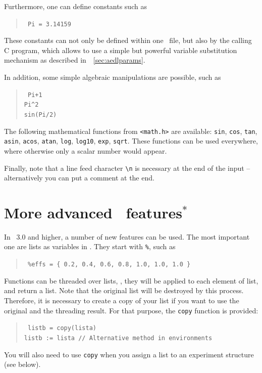 Furthermore, one can define constants such as
\begin{quote}
{\tt
Pi = 3.14159
}
\end{quote}
These constants can not only be defined within one \AEDL\ file, but also
by the calling C program, which allows to use a simple but powerful variable
substitution mechanism as described in~\Sec~\ref{sec:aedlparams}.

In addition, some simple algebraic manipulations are possible, such as
\begin{quote}
{\tt
Pi+1\\
\verb+Pi^2+\\
sin(Pi/2)
}
\end{quote}
The following mathematical functions from {\tt <math.h>} are available: 
{\tt sin}, {\tt cos}, {\tt tan}, {\tt asin}, {\tt acos}, {\tt atan}, 
{\tt log}, {\tt log10}, {\tt exp}, {\tt sqrt}.
%
%
%
%
%
%
%
%
%
%
% 
These functions can be used everywhere, where
otherwise only a scalar number would appear. 

Finally, note that a line feed character \verb+\n+ is necessary at
 the end of the input -- alternatively you can put a comment at the end.

\section{More advanced \AEDL\ features$^*$}
\label{sec:advaedl}

In \GLOBES\ 3.0 and higher, a number of new features can be used.  The
most important one are lists as variables in \AEDL . They start with {\tt \%}, such as
\begin{quote}
{\tt
\%effs = \{ 0.2, 0.4, 0.6, 0.8, 1.0, 1.0, 1.0 \}
}
\end{quote}
Functions can be threaded over lists, \ie, they will be applied to each element
of list, and return a list. Note that the original list will be destroyed by this
process. Therefore, it is necessary to create a copy of your list if you want to
use the original and the threading result. For that purpose, the {\tt copy}
function is provided:
\begin{quote}
{\tt
 listb = copy(lista) \\
 listb := lista // Alternative method in environments
}
\end{quote}
You will also need to use {\tt copy} when you assign a list to an experiment structure (see below).

